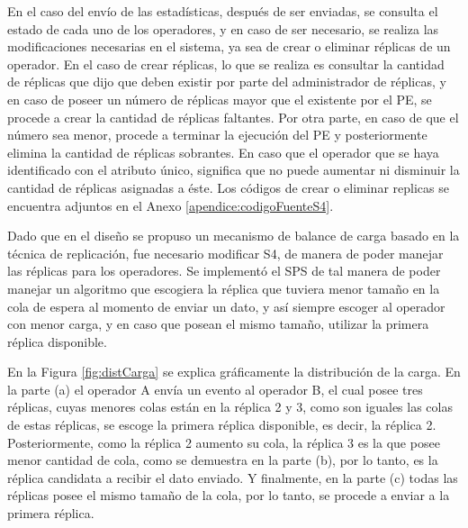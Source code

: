 En el caso del envío de las estadísticas, después de ser enviadas, se consulta el estado de cada uno de los operadores, y en caso de ser necesario, se realiza las modificaciones necesarias en el sistema, ya sea de crear o eliminar réplicas de un operador. En el caso de crear réplicas, lo que se realiza es consultar la cantidad de réplicas que dijo que deben existir por parte del administrador de réplicas, y en caso de poseer un número de réplicas mayor que el existente por el PE, se procede a crear la cantidad de réplicas faltantes. Por otra parte, en caso de que el número sea menor, procede a terminar la ejecución del PE y posteriormente elimina la cantidad de réplicas sobrantes. En caso que el operador que se haya identificado con el atributo único, significa que no puede aumentar ni disminuir la cantidad de réplicas asignadas a éste. Los códigos de crear o eliminar replicas se encuentra adjuntos en el Anexo \ref{apendice:codigoFuenteS4}.

Dado que en el diseño se propuso un mecanismo de balance de carga basado en la técnica de replicación, fue necesario modificar S4, de manera de poder manejar las réplicas para los operadores. Se implementó el SPS de tal manera de poder manejar un algoritmo que escogiera la réplica que tuviera menor tamaño en la cola de espera al momento de enviar un dato, y así siempre escoger al operador con menor carga, y en caso que posean el mismo tamaño, utilizar la primera réplica disponible.

En la Figura \ref{fig:distCarga} se explica gráficamente la distribución de la carga. En la parte (a) el operador A envía un evento al operador B, el cual posee tres réplicas, cuyas menores colas están en la réplica 2 y 3, como son iguales las colas de estas réplicas, se escoge la primera réplica disponible, es decir, la réplica 2. Posteriormente, como la réplica 2 aumento su cola, la réplica 3 es la que posee menor cantidad de cola, como se demuestra en la parte (b), por lo tanto, es la réplica candidata a recibir el dato enviado. Y finalmente, en la parte (c) todas las réplicas posee el mismo tamaño de la cola, por lo tanto, se procede a enviar a la primera réplica.

